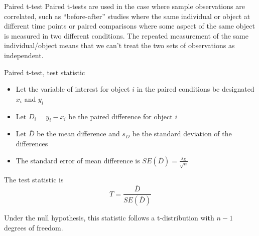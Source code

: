 \documentclass[presentation]{beamer}
\begin{document}
\begin{frame}[label={sec:orgabdc0ea}]{Paired t-test}
Paired t-tests are used in the case where sample observations are correlated, such as ``before-after'' studies where the same individual or object at different time points or paired comparisons where some aspect of the same object is measured in two different conditions. The repeated measurement of the same individual/object means that we can't treat the two sets of observations as independent.
\end{frame}

\begin{frame}[label={sec:orgb0a590c}]{Paired t-test, test statistic}
\begin{itemize}
\item Let the variable of interest for object \(i\) in the paired conditions be designated \(x_i\) and \(y_i\)
\item Let \(D_i = y_i - x_i\) be the paired difference for object \(i\)
\item Let \(\overline{D}\) be the mean difference and \(s_D\) be the standard deviation of the differences
\item The standard error of mean difference is  \(SE(\overline{D}) = \frac{s_D}{\sqrt{n}}\)
\end{itemize}

The test statistic is 
\[
T = \frac{\overline{D}}{SE(\overline{D})}
\] 

Under the null hypothesis, this statistic follows a t-distribution with \(n-1\) degrees of freedom.
\end{frame}
\end{document}
